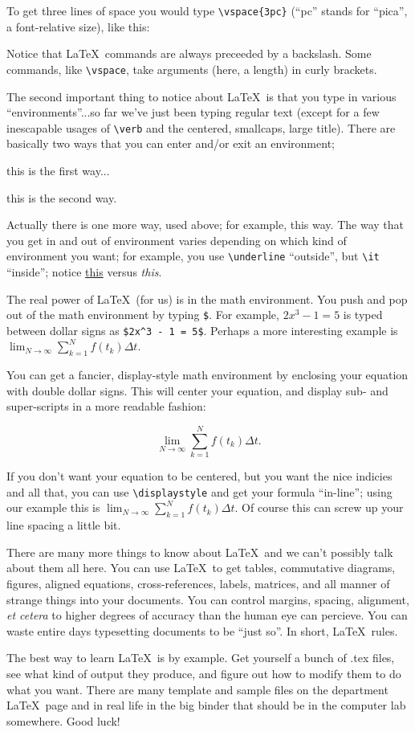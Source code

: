 \documentclass{article}
\begin{document}
To get three lines of space you would type \verb|\vspace{3pc}|
(``pc'' stands for ``pica'', a font-relative size), like this:
\vspace{3pc}

Notice that \LaTeX\ commands are always preceeded by a backslash.  
Some commands, like \verb|\vspace|, take arguments (here, a length) in
curly brackets.  

The second important thing to notice about \LaTeX\ is that you type 
in various ``environments''...so far we've just been typing regular 
text (except for a few inescapable usages of \verb|\verb| and the
centered, smallcaps, large title).  There are basically two ways that 
you can enter and/or exit an environment;
\vspace{1pc}

\centerline{this is the first way...}

\begin{center}
this is the second way.
\end{center}

\noindent Actually there is one more way, used above; for example, 
{\sc this way}.  The way that you get in and out of environment varies
depending on which kind of environment you want; for example, you use 
\verb|\underline| ``outside'', but \verb|\it| ``inside''; 
notice \underline{this} versus {\it this}.

The real power of \LaTeX\ (for us) is in the math environment. You 
push and pop out of the math environment by typing \verb|$|. For 
example, $2x^3 - 1 = 5$ is typed between dollar signs as
\verb|$2x^3 - 1 = 5$|. Perhaps a more interesting example is
$\lim_{N \to \infty} \sum_{k=1}^N f(t_k) \Delta t$.

You can get a fancier, display-style math 
environment by enclosing your equation with double dollar signs.  
This will center your equation, and display sub- and super-scripts in 
a more readable fashion:

$$\lim_{N \to \infty} \sum_{k=1}^N f(t_k) \Delta t.$$

If you don't want your equation to be centered, but you want the nice 
indicies and all that, you can use \verb|\displaystyle| and get your 
formula ``in-line''; using our example this is 
$\displaystyle \lim_{N \to \infty} \sum_{k=1}^N f(t_k) \Delta t.$  Of 
course this can screw up your line spacing a little bit.

There are many more things to know about \LaTeX\ and we can't 
possibly talk about them all here.
You can use \LaTeX\ to get tables, commutative diagrams, figures, 
aligned equations, cross-references, labels, matrices, and all manner 
of strange things into your documents.  You can control margins, 
spacing, alignment, {\it et cetera} to higher degrees of accuracy than 
the human eye can percieve.  You can waste entire days typesetting 
documents to be ``just so''.  In short, \LaTeX\ rules.

The best way to learn \LaTeX\ is by example. Get yourself a bunch
of .tex files, see what kind of output they produce, and figure out how
to modify them to do what you want.  There are many template and 
sample files on the department \LaTeX\ page and in real life in the 
big binder that should be in the computer lab somewhere.  Good luck!
\end{document}
